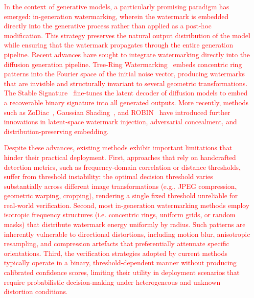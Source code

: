 \textcolor{red}{
 In the context of generative models, a particularly promising paradigm has emerged: in-generation watermarking, wherein the watermark is embedded directly into the generative process rather than applied as a post-hoc modification. This strategy preserves the natural output distribution of the model while ensuring that the watermark propagates through the entire generation pipeline. Recent advances have sought to integrate watermarking directly into the diffusion generation pipeline. Tree-Ring Watermarking~\cite{wen2023tree_ring} embeds concentric ring patterns into the Fourier space of the initial noise vector, producing watermarks that are invisible and structurally invariant to several geometric transformations. The Stable Signature~\cite{fernandez2023stable} fine-tunes the latent decoder of diffusion models to embed a recoverable binary signature into all generated outputs. More recently, methods such as ZoDiac~\cite{zhang2024attack}, Gaussian Shading~\cite{yang2024gaussian}, and ROBIN~\cite{huang2024robin} have introduced further innovations in latent-space watermark injection, adversarial concealment, and distribution-preserving embedding.
}

\textcolor{red}{
Despite these advances, existing methods exhibit important limitations that hinder their practical deployment. First, approaches that rely on handcrafted detection metrics, such as frequency-domain correlation or distance thresholds, suffer from threshold instability: the optimal decision threshold varies substantially across different image transformations (e.g., JPEG compression, geometric warping, cropping), rendering a single fixed threshold unreliable for real-world verification. Second, most in-generation watermarking methods employ isotropic frequency structures (i.e. concentric rings, uniform grids, or random masks) that distribute watermark energy uniformly by radius. Such patterns are inherently vulnerable to directional distortions, including motion blur, anisotropic resampling, and compression artefacts that preferentially attenuate specific orientations. Third, the verification strategies adopted by current methods typically operate in a binary, threshold-dependent manner without producing calibrated confidence scores, limiting their utility in deployment scenarios that require probabilistic decision-making under heterogeneous and unknown distortion conditions.}

